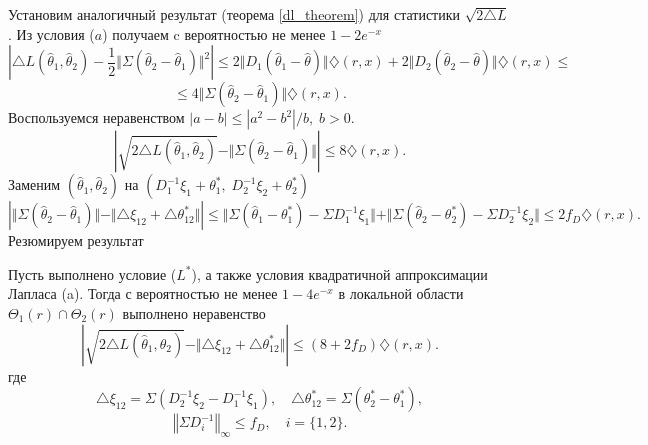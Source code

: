 Установим аналогичный результат (теорема \ref{dl_theorem}) для статистики $\sqrt{2 \triangle L}$. Из условия ($a$) получаем c вероятностью не менее $1 - 2e^{-x}$
\[
\left| \triangle L (\widehat{\theta}_1, \widehat{\theta}_2) - \frac{1}{2} \Vert \Sigma (\widehat{\theta}_2 -\widehat{\theta}_1) \Vert^2 \right| \leq 
2 \Vert D_1(\widehat{\theta}_1 - \widehat{\theta}) \Vert \diamondsuit (r, x) + 2 \Vert D_2(\widehat{\theta}_2 - \widehat{\theta}) \Vert \diamondsuit (r, x) 
\leq 
\] 
\[
\leq  4  \Vert  \Sigma(\widehat{\theta}_2 - \widehat{\theta}_1)  \Vert  \diamondsuit (r, x).
\]
Воспользуемся неравенством $|a - b| \leq |a^2 - b^2| / b, \; b >0$.
\[
\left| \sqrt{ 2\triangle L (\widehat{\theta}_1, \widehat{\theta}_2) } -  \Vert \Sigma (\widehat{\theta}_2 -\widehat{\theta}_1) \Vert \right| \leq 
8   \diamondsuit (r, x).
\]
Заменим $(\widehat{\theta}_1, \widehat{\theta}_2)$ на $(D_1^{-1}\xi_1 + \theta_1^*, \; D_2^{-1}\xi_2 + \theta_2^*)$
\[
\left| \Vert \Sigma (\widehat{\theta}_2 -\widehat{\theta}_1) \Vert  - 
\Vert \triangle \xi_{12} + \triangle \theta_{12}^* \Vert 
\right |
\leq  \Vert \Sigma(\widehat{\theta}_1 - \theta_1^*) - \Sigma D_1^{-1} \xi_1 \Vert
+ \Vert \Sigma(\widehat{\theta}_2 - \theta_2^*) - \Sigma D_2^{-1} \xi_2 \Vert
\leq  2 f_D \diamondsuit (r, x).
\]
Резюмируем результат 
\begin{theorem}
\label{dl_sq_theorem}

Пусть выполнено условие ($L^*$), а также условия квадратичной аппроксимации  Лапласа (a). Тогда с вероятностью не менее $1 - 4 e^{-x}$ в локальной области $\Theta_1(r) \cap \Theta_2(r)$ выполнено неравенство
\[
\left| 
\sqrt{ 2\triangle L (\widehat{\theta}_1, \widehat{\theta}_2) } - 
\Vert \triangle \xi_{12} + \triangle \theta_{12}^* \Vert 
\right| \leq 
(8 + 2 f_D)  \diamondsuit (r, x).
\]
где
\[
\triangle \xi_{12}  = \Sigma (D_2^{-1} \xi_2 - D_1^{-1} \xi_1),
\quad
\triangle \theta_{12}^*  = \Sigma (\theta_2^* - \theta_1^*), 
\]
\[
\left\Vert  \Sigma D^{-1}_i  \right\Vert_{\infty} \leq f_D, 
\quad i = \{1,2\}.
\]

\end{theorem}

